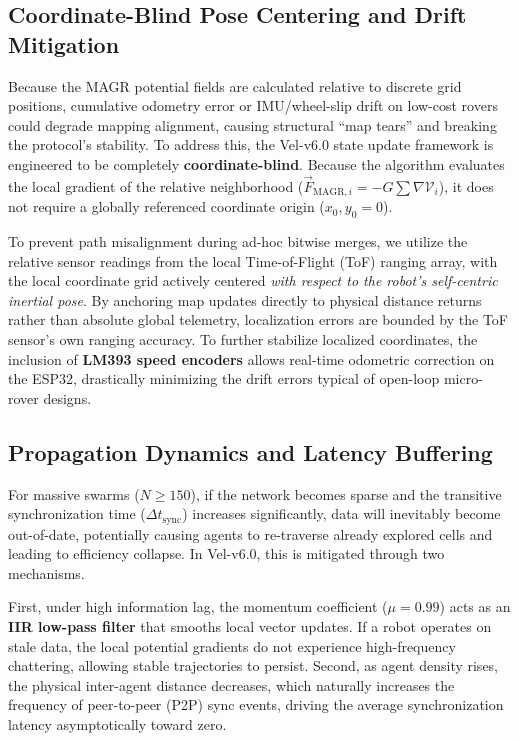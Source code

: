 \documentclass[journal,twoside]{IEEEtran}
\begin{document}
\subsection{Coordinate-Blind Pose Centering and Drift Mitigation}
Because the MAGR potential fields are calculated relative to discrete grid positions, cumulative odometry error or IMU/wheel-slip drift on low-cost rovers could degrade mapping alignment, causing structural ``map tears'' and breaking the protocol's stability. To address this, the Vel-v6.0 state update framework is engineered to be completely \textbf{coordinate-blind}. Because the algorithm evaluates the local gradient of the relative neighborhood ($\vec{F}_{\text{MAGR}, i} = -G \sum \nabla \mathcal{V}_i$), it does not require a globally referenced coordinate origin ($x_0, y_0 = 0$).

To prevent path misalignment during ad-hoc bitwise merges, we utilize the relative sensor readings from the local Time-of-Flight (ToF) ranging array, with the local coordinate grid actively centered \textit{with respect to the robot's self-centric inertial pose}. By anchoring map updates directly to physical distance returns rather than absolute global telemetry, localization errors are bounded by the ToF sensor's own ranging accuracy. To further stabilize localized coordinates, the inclusion of \textbf{LM393 speed encoders} allows real-time odometric correction on the ESP32, drastically minimizing the drift errors typical of open-loop micro-rover designs.

\subsection{Propagation Dynamics and Latency Buffering}
For massive swarms ($N \ge 150$), if the network becomes sparse and the transitive synchronization time ($\Delta t_{\text{sync}}$) increases significantly, data will inevitably become out-of-date, potentially causing agents to re-traverse already explored cells and leading to efficiency collapse. In Vel-v6.0, this is mitigated through two mechanisms.

First, under high information lag, the momentum coefficient ($\mu = 0.99$) acts as an \textbf{IIR low-pass filter} that smooths local vector updates. If a robot operates on stale data, the local potential gradients do not experience high-frequency chattering, allowing stable trajectories to persist. Second, as agent density rises, the physical inter-agent distance decreases, which naturally increases the frequency of peer-to-peer (P2P) sync events, driving the average synchronization latency asymptotically toward zero.
\end{document}
